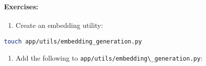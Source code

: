 \documentclass[
  screen,review,acmlarge]{acmart}
\newcommand{\passthrough}[1]{#1}
\providecommand{\tightlist}{%
  \setlength{\itemsep}{0pt}\setlength{\parskip}{0pt}}
\begin{document}
\paragraph{Exercises:}\label{exercises-2}

\begin{enumerate}
\def\labelenumi{\arabic{enumi}.}
\tightlist
\item
  Create an embedding utility:
\end{enumerate}

\begin{lstlisting}[language=bash]
touch app/utils/embedding_generation.py
\end{lstlisting}

\begin{enumerate}
\def\labelenumi{\arabic{enumi}.}
\setcounter{enumi}{1}
\tightlist
\item
  Add the following to \passthrough{\lstinline!app/utils/embedding\_generation.py!}:
\end{enumerate}
\end{document}
